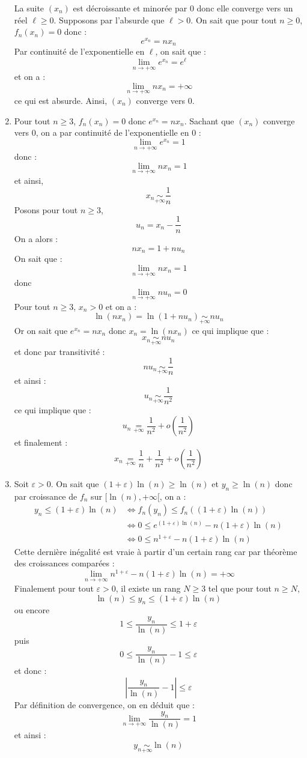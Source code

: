 \documentclass[a4paper,10pt]{report}
\begin{document}
\begin{enumerate}
\noindent La suite $(x_n)$ est décroissante et minorée par $0$ donc elle converge vers un réel $\ell \geq 0$. Supposons par l'absurde que $\ell>0$. On sait que pour tout $n \geq 0$, $f_n(x_n)=0$ donc :
$$e^{x_n} = nx_n$$
Par continuité de l'exponentielle en $\ell$, on sait que :
$$ \lim_{n \rightarrow + \infty} e^{x_n} = e^{\ell}$$
et on a :
$$ \lim_{n \rightarrow + \infty} nx_n = + \infty$$
ce qui est absurde. Ainsi, $(x_n)$ converge vers $0$.
\item Pour tout $n \geq 3$, $f_n(x_n)=0$ donc $e^{x_n} = nx_n$. Sachant que $(x_n)$ converge vers $0$, on a par continuité de l'exponentielle en $0$ :
$$ \lim_{n \rightarrow + \infty} e^{x_n} = 1$$
donc :
$$ \lim_{n \rightarrow + \infty} n x_n = 1$$
et ainsi,
$$x_n \underset{+ \infty}{\sim} \dfrac{1}{n}$$
Posons pour tout $n \geq 3$,
$$ u_n = x_n - \dfrac{1}{n}$$
On a alors :
$$ nx_n =1+n u_n $$
On sait que :
$$ \lim_{n \rightarrow + \infty} n x_n = 1$$
donc 
$$ \lim_{n \rightarrow + \infty} n u_n = 0$$
Pour tout $n \geq 3$, $x_n >0$ et on a :
$$ \ln(nx_n) = \ln(1+n u_n) \underset{+ \infty}{\sim} n u_n$$
Or on sait que $e^{x_n}=nx_n$ donc $x_n = \ln(nx_n)$ ce qui implique que :
$$ x_n \underset{+ \infty}{\sim} n u_n $$
et donc par transitivité :
$$ n u_n \underset{+ \infty}{\sim}  \dfrac{1}{n}$$
et ainsi :
$$ u_n \underset{+ \infty}{\sim}  \dfrac{1}{n^2}$$
ce qui implique que :
$$ u_n \underset{+ \infty}{=} \dfrac{1}{n^2} + o \left( \dfrac{1}{n^2} \right)$$
et finalement :
$$ x_n  \underset{+ \infty}{=} \dfrac{1}{n} + \dfrac{1}{n^2} + o \left( \dfrac{1}{n^2} \right)$$
\item Soit $\varepsilon >0$. On sait que $(1+ \varepsilon) \ln(n) \geq \ln(n)$ et $y_n \geq \ln(n)$ donc par croissance de $f_n$ sur $[\ln(n), + \infty[$, on a :
\begin{align*}
y_n \leq (1+ \varepsilon) \ln(n)&  \Longleftrightarrow f_n(y_n) \leq f_n((1+ \varepsilon) \ln(n)) \\
 & \Longleftrightarrow 0 \leq e^{(1+ \varepsilon) \ln(n)} - n (1+ \varepsilon) \ln(n) \\
 & \Longleftrightarrow 0 \leq n^{1+ \varepsilon} - n(1+ \varepsilon) \ln(n) 
 \end{align*}
Cette dernière inégalité est vraie à partir d'un certain rang car par théorème des croissances comparées :
$$ \lim_{n \rightarrow + \infty}  n^{1+ \varepsilon} - n(1+ \varepsilon) \ln(n)  = + \infty$$
Finalement pour tout $\varepsilon>0$, il existe un rang $N \geq 3$ tel que pour tout $n \geq N$,
$$ \ln(n) \leq y_n \leq (1+ \varepsilon) \ln(n)$$
ou encore 
$$ 1 \leq \dfrac{y_n}{\ln(n)} \leq 1+ \varepsilon$$
puis 
$$ 0 \leq \dfrac{y_n}{\ln(n)} - 1 \leq \varepsilon$$
et donc :
$$ \left\vert \dfrac{y_n}{\ln(n)} - 1 \right\vert \leq \varepsilon$$
Par définition de convergence, on en déduit que :
$$ \lim_{n \rightarrow + \infty} \dfrac{y_n}{\ln(n)} = 1$$
et ainsi :
$$ y_n \underset{+ \infty}{\sim} \ln(n)$$

\end{enumerate}
\end{document}
